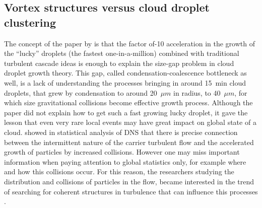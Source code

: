 \documentclass[../main.tex]{subfiles}
\begin{document}
\subsection{Vortex structures versus cloud droplet clustering}

The concept of the paper by \citet{Kostinski2005} is that the factor of-10 acceleration in the growth of the “lucky” droplets (the fastest one-in-a-million) combined with traditional turbulent cascade ideas is enough to explain the size-gap problem in cloud droplet growth theory. This gap, called condensation-coalescence bottleneck as well, is a lack of understanding the processes bringing in around 15~min  cloud droplets, that grew by condensation to around 20~$\mu m$ in radius, to 40~$\mu m$, for which size gravitational collisions become effective growth process. Although the \citet{Kostinski2005} paper did not explain how to get such a fast growing lucky droplet, it gave the lesson that even very rare local events may have great impact on global state of a cloud. \citet{Bec2016} showed in statistical analysis of DNS that there is precise connection between the intermittent nature of the carrier turbulent flow and the accelerated growth of particles by increased collisions. However one may miss important information when paying attention to global statistics only, for example where and how this collisions occur. For this reason, the researchers studying the distribution and collisions of particles in the flow, became interested in the trend of searching for coherent structures in turbulence that can influence this processes \citep{Davila2001, Bec2006a, Biferale2016, Bhatnagar2016, Perrin2016}.\\
\end{document}
